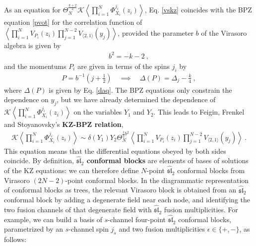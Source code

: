 \documentclass[12pt, a4paper, notitlepage, twoside]{report}
\numberwithin{equation}{section}
\theoremstyle{break}
\begin{document}
As an equation for $\Theta_N^{\frac{k+2}{2}}\mathcal{K}\left\langle \prod_{i=1}^N \Phi^{j_i}_{X_i}(z_i)\right\rangle$,
Eq. \eqref{vskz} coincides with the BPZ equation \eqref{pvot} for the correlation function of $\left\langle \prod_{i=1}^N V_{P_i}(z_i) \prod_{j=1}^{N-2}V_{\langle 2,1\rangle}(y_j)\right\rangle$, provided the parameter $b$ of the Virasoro algebra is given by 
\begin{align}
 \boxed{ b^2 = -k-2}\ ,
\label{bk}
\end{align}
and the momentums $P_i$ are given in terms of the spins $j_i$ by 
\begin{align}
 \boxed{P = b^{-1}\left(j+\tfrac12\right)}\quad \implies \quad \boxed{\Delta(P) = \Delta_j-\frac{k}{4}}\ ,
\label{aj}
\end{align}
where $\Delta(P)$ is given by Eq. \eqref{daq}.
The BPZ equations only constrain the dependence on $y_j$, but we have already determined the dependence of  
$\mathcal{K}\left\langle \prod_{i=1}^N \Phi^{j_i}_{X_i}(z_i)\right\rangle$ on the variables $Y_1$ and $Y_2$.
This leads to Feigin, Frenkel and Stoyanovsky's \textbf{\boldmath KZ-BPZ relation},
\begin{align}
 \boxed{ \mathcal{K}\left\langle \prod_{i=1}^N \Phi^{j_i}_{X_i}(z_i)\right\rangle \sim \delta(Y_1) Y_2 \Theta_N^{\frac12 b^2} \left\langle \prod_{i=1}^N V_{P_i}(z_i)\prod_{j=1}^{N-2}V_{\langle 2,1\rangle}(y_j)\right\rangle}\ .
\label{dyy}
\end{align}
This equation means that the differential equations obeyed by both sides coincide.
By definition, \textbf{\boldmath $\widehat{\mathfrak{sl}}_2$ conformal blocks} are elements of bases of solutions of the KZ equations: we can therefore define $N$-point $\widehat{\mathfrak{sl}}_2$ conformal blocks from Virasoro $(2N-2)$-point conformal blocks. 
In the diagrammatic representation of conformal blocks as trees, the relevant Virasoro block is obtained from an $\widehat{\mathfrak{sl}}_2$ conformal block by adding a degenerate field near each node, and identifying the two fusion channels of that degenerate field with $\widehat{\mathfrak{sl}}_2$ fusion multiplicities.
For example, we can build a basis of $s$-channel four-point $\widehat{\mathfrak{sl}}_2$ conformal blocks, parametrized by an $s$-channel spin $j_s$ and two fusion multiplicities $\epsilon \in \{+,-\}$, as follows:
\end{document}
